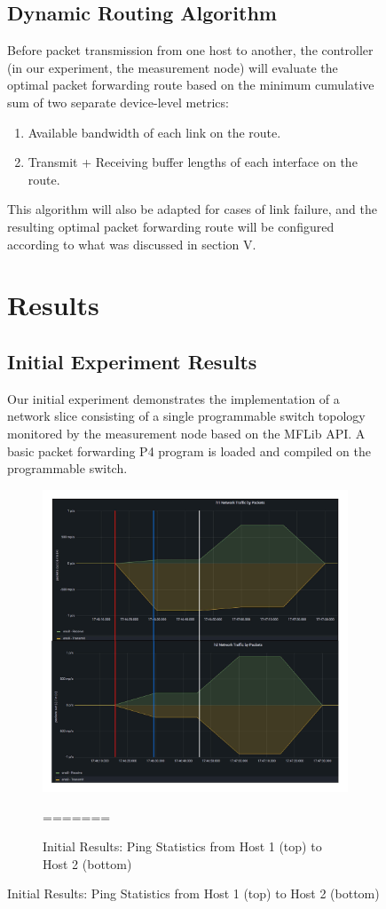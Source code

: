 \documentclass[conference]{IEEEtran}
\begin{document}
\begin{figure}[h!]
    \subsection{Dynamic Routing Algorithm}
      Before packet transmission from one host to another, the controller (in our experiment, the measurement node) will evaluate the optimal packet forwarding route based on the minimum cumulative sum of two separate device-level metrics:
      \begin{enumerate}
          \item Available bandwidth of each link on the route. 
          \item Transmit + Receiving buffer lengths of each interface on the route.
      \end{enumerate}
      This algorithm will also be adapted for cases of link failure, and the resulting optimal packet forwarding route will be configured according to what was discussed in section V.

    \section{Results}
    \subsection{Initial Experiment Results}
    Our initial experiment demonstrates the implementation of a network slice consisting of a single programmable switch topology monitored by the measurement node based on the MFLib API. A basic packet forwarding P4 program is loaded and compiled on the programmable switch.
    \begin{figure}[b]
        \includegraphics[scale=0.4]{packetgraph.jpeg}
        \centering
        \caption{Initial Results: Ping Statistics from Host 1 (top) to Host 2 (bottom)}
=======


\end{figure}
\end{figure}
\end{document}

